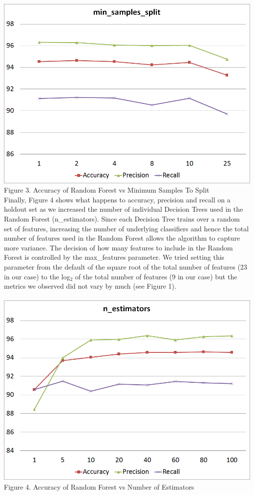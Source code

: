 \documentclass[twoside,11pt]{homework}
\begin{document}
\includegraphics[scale=0.5]{min_split.png}
\\
Figure 3. Accuracy of Random Forest vs Minimum Samples To Split
\\

Finally, Figure 4 shows what happens to accuracy, precision and recall on a holdout set as we increased the 
number of individual Decision Trees used in the Random Forest (n\_estimators). Since each Decision Tree trains
over a random set of features, increasing the number of underlying classifiers and hence the total number of features
used in the Random Forest allows the algorithm to capture more variance. The decision of how many features to include
in the Random Forest is controlled by the max\_features parameter. We tried setting this parameter from the default of the square
root of the total number of features (23 in our case) to the log$_2$ of the total number of features (9 in our case)
but the metrics we observed did not vary by much (see Figure 1). 
\\
\\
\includegraphics[scale=0.5]{n_estimators.png}
\\
Figure 4. Accuracy of Random Forest vs Number of Estimators
\\
\end{document}
